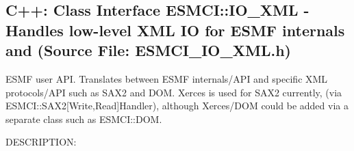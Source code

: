  
\setlength{\oldparskip}{\parskip}
\setlength{\parskip}{1.5ex}
\setlength{\oldparindent}{\parindent}
\setlength{\parindent}{0pt}
\setlength{\oldbaselineskip}{\baselineskip}
\setlength{\baselineskip}{11pt}
 
\def\bv{\begin{verbatim}}
\def\ev{\end{verbatim}}
\def\be{\begin{equation}}
\def\ee{\end{equation}}
\def\bea{\begin{eqnarray}}
\def\eea{\end{eqnarray}}
\def\bi{\begin{itemize}}
\def\ei{\end{itemize}}
\def\bn{\begin{enumerate}}
\def\en{\end{enumerate}}
\def\bd{\begin{description}}
\def\ed{\end{description}}
\def\({\left (}
\def\){\right )}
\def\[{\left [}
\def\]{\right ]}
\def\<{\left  \langle}
\def\>{\right \rangle}
\def\cI{{\cal I}}
\def\diag{\mathop{\rm diag}}
\def\tr{\mathop{\rm tr}}


 
\subsection{C++:  Class Interface ESMCI::IO\_XML - Handles low-level XML IO for ESMF internals and (Source File: ESMCI\_IO\_XML.h)}


    ESMF user API.  Translates between ESMF internals/API and specific XML
    protocols/API such as SAX2 and DOM.  Xerces is used for SAX2 currently,
    (via ESMCI::SAX2[Write,Read]Handler), although Xerces/DOM could 
    be added via a separate class such as ESMCI::DOM.
  
{\sf DESCRIPTION:\\ }


